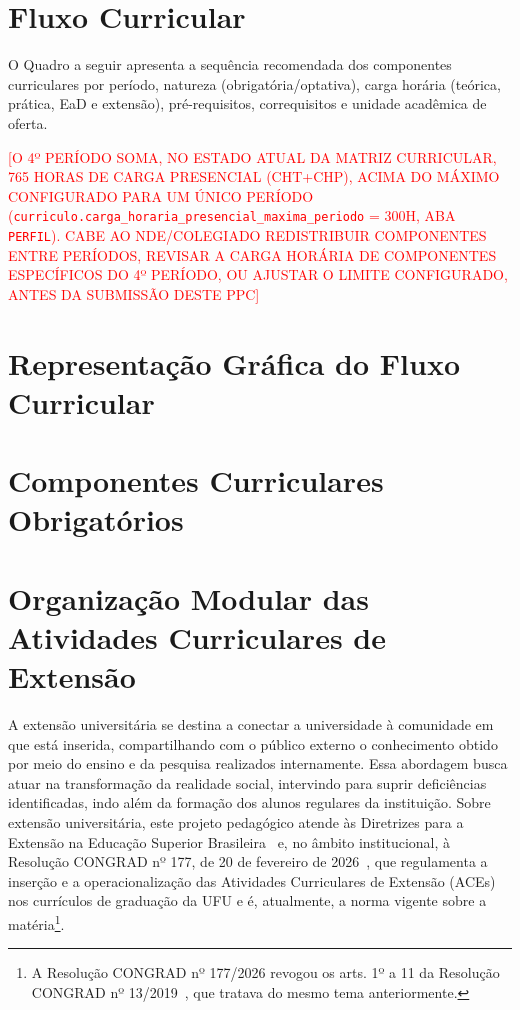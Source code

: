 \section{Fluxo Curricular}
\label{sec:fluxo}

O Quadro a seguir apresenta a sequência recomendada dos componentes curriculares por período, natureza (obrigatória/optativa), carga horária (teórica, prática, EaD e extensão), pré-requisitos, correquisitos e unidade acadêmica de oferta.

\textcolor{red}{[O 4º PERÍODO SOMA, NO ESTADO ATUAL DA MATRIZ CURRICULAR, 765 HORAS DE CARGA PRESENCIAL (CHT+CHP), ACIMA DO MÁXIMO CONFIGURADO PARA UM ÚNICO PERÍODO (\texttt{curriculo.carga\_horaria\_presencial\_maxima\_periodo} = 300H, ABA \texttt{PERFIL}). CABE AO NDE/COLEGIADO REDISTRIBUIR COMPONENTES ENTRE PERÍODOS, REVISAR A CARGA HORÁRIA DE COMPONENTES ESPECÍFICOS DO 4º PERÍODO, OU AJUSTAR O LIMITE CONFIGURADO, ANTES DA SUBMISSÃO DESTE PPC]}



\newpage
\section{Representação Gráfica do Fluxo Curricular}

\begin{landscape}

\end{landscape}

\newpage
\section{Componentes Curriculares Obrigatórios}


\section{Organização Modular das Atividades Curriculares de Extensão}
\label{sec:ace}

A extensão universitária se destina a conectar a universidade à comunidade em que está inserida, compartilhando com o público externo o conhecimento obtido por meio do ensino e da pesquisa realizados internamente. Essa abordagem busca atuar na transformação da realidade social, intervindo para suprir deficiências identificadas, indo além da formação dos alunos regulares da instituição. Sobre extensão universitária, este projeto pedagógico atende às Diretrizes para a Extensão na Educação Superior Brasileira~\cite{cne_ces_7_2018} e, no âmbito institucional, à Resolução CONGRAD nº 177, de 20 de fevereiro de 2026~\cite{ufu_congrad_177_2026}, que regulamenta a inserção e a operacionalização das Atividades Curriculares de Extensão (ACEs) nos currículos de graduação da UFU e é, atualmente, a norma vigente sobre a matéria\footnote{A Resolução CONGRAD nº 177/2026 revogou os arts. 1º a 11 da Resolução CONGRAD nº 13/2019~\cite{ufu_congrad_13_2019}, que tratava do mesmo tema anteriormente.}.

